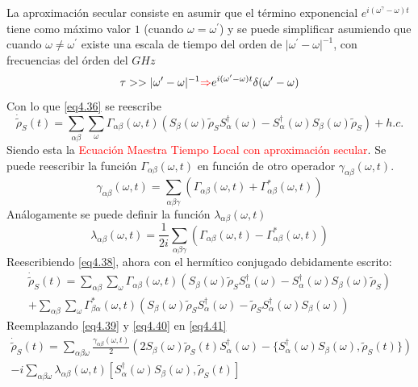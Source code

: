 \documentclass{book}
\begin{document}
La aproximación secular consiste en asumir que el término exponencial $e^{i(\omega^\gamma-\omega)t}$ tiene como máximo valor $1$ (cuando $\omega=\omega^\prime$) y se puede simplificar asumiendo que 
cuando $\omega\neq\omega^\prime$ existe una escala de tiempo del orden de $\lvert\omega^\prime-\omega\rvert^{-1}$, con frecuencias del órden del $GHz$
\begin{equation}\label{4.37}\tau>>\lvert\omega^\prime-\omega\rvert^{-1}\textcolor{red}{\Rightarrow} e^{i(\omega^\prime-\omega)t}\delta(\omega^\prime-\omega)\end{equation} Con lo que \ref{eq4.36} se reescribe \begin{equation}\label{eq4.38}\dot{\tilde{\rho}}_S(t)=\sum_{\alpha\beta}\sum_{\omega}\Gamma_{\alpha\beta}(\omega,t)(S_\beta(\omega)\tilde{\rho}_SS_\alpha^\dag(\omega)-S_\alpha^\dag(\omega)S_\beta(\omega)\tilde{\rho}_S)+h.c.\end{equation}
Siendo esta la \textcolor{red}{Ecuación Maestra Tiempo Local con aproximación secular}.
Se puede reescribir la función $\Gamma_{\alpha\beta}(\omega,t)$ en función de otro operador $\gamma_{\alpha\beta}(\omega,t)$.
\begin{equation}\label{eq4.39}\gamma_{\alpha\beta}(\omega,t)=\sum_{\alpha\beta\gamma}(\Gamma_{\alpha\beta}(\omega,t)+\Gamma^*_{\alpha\beta}(\omega,t))\end{equation}
Análogamente se puede definir la función $\lambda_{\alpha\beta}(\omega,t)$
\begin{equation}\label{eq4.40}\lambda_{\alpha\beta}(\omega,t)=\frac{1}{2i}\sum_{\alpha\beta\gamma}(\Gamma_{\alpha\beta}(\omega,t)-\Gamma^*_{\alpha\beta}(\omega,t))\end{equation}
Reescribiendo \ref{eq4.38}, ahora con el hermítico conjugado debidamente escrito: 
\begin{equation}\label{eq4.41}\begin{aligned}\dot{\tilde{\rho}}_S(t)=\sum_{\alpha\beta}\sum_{\omega}\Gamma_{\alpha\beta}(\omega,t)(S_\beta(\omega)\tilde{\rho}_SS_\alpha^\dag(\omega)-S_\alpha^\dag(\omega)S_\beta(\omega)\tilde{\rho}_S)\\ +\sum_{\alpha\beta}\sum_{\omega}\Gamma^*_{\beta\alpha}(\omega,t)(S_\beta(\omega)\tilde{\rho}_SS_\alpha^\dag(\omega)-\tilde{\rho}_SS_\alpha^\dag(\omega)S_\beta(\omega))\end{aligned}\end{equation}
Reemplazando \ref{eq4.39} y \ref{eq4.40} en \ref{eq4.41}
\begin{equation}\label{eq4.42}\begin{aligned}\dot{\tilde{\rho}}_S(t)=\sum_{\alpha\beta\omega}\frac{\gamma_{\alpha\beta}(\omega,t)}{2}(2S_\beta(\omega)\tilde{\rho}_S(t)S_\alpha^\dag(\omega)-\{S_\alpha^\dag(\omega)S_\beta(\omega),\tilde{\rho}_S(t)\})\\ -i\sum_{\alpha\beta\omega}\lambda_{\alpha\beta}(\omega,t)[S_\alpha^\dag(\omega)S_\beta(\omega),\tilde{\rho}_S(t)]\end{aligned}\end{equation}
\end{document}
